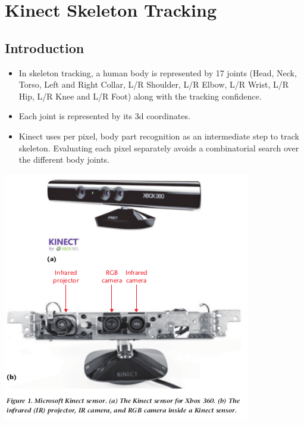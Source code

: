 \documentclass[a4paper,10pt]{report}
\title {\strong{Week 1 Update}}
\author{Rajat Saxena}
\begin{document}
\maketitle

\section{Kinect Skeleton Tracking}

\subsection{Introduction}
\begin{itemize}
 \item In skeleton tracking, a human body is represented by 17 joints (Head, Neck, Torso, Left and Right Collar, L/R Shoulder, L/R Elbow, L/R Wrist, L/R Hip, L/R Knee and L/R Foot) along with the tracking confidence.
 \item Each joint is represented by its 3d coordinates.
 \item Kinect uses per pixel, body part recognition as an intermediate step to track skeleton. Evaluating each pixel separately avoids a combinatorial search over the different body joints.
\end{itemize}

\newline
\newline
\includegraphics[scale=0.4,keepaspectratio=true]{./3.png}
\end{document}
